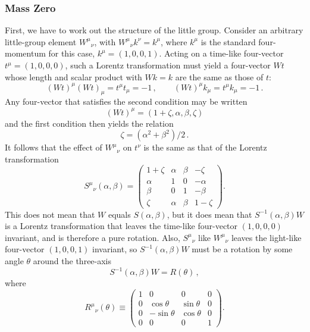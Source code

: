 \subsubsection*{Mass Zero}

First, we have to work out the structure of the little group. Consider an
arbitrary little-group element $W^\mu{}_{\nu}$, with
$W^\mu{}_{\nu}k^\nu=k^\mu$, where $k^\mu$ is the standard four-momentum for
this case, $k^\mu=(1,0,0,1)$. Acting on a time-like four-vector
$t^\mu=(1,0,0,0)$, such a Lorentz transformation must yield a four-vector
$Wt$ whose length and scalar product with $Wk=k$ are the same as those of $t$:
\[
(Wt)^\mu(Wt)_\mu=t^\mu t_\mu=-1\,,
\qquad
(Wt)^\mu k_\mu=t^\mu k_\mu=-1\,.
\]
Any four-vector that satisfies the second condition may be written
\[
(Wt)^\mu=(1+\zeta,\alpha,\beta,\zeta)
\]
and the first condition then yields the relation
\begin{equation}
\zeta=(\alpha^2+\beta^2)/2\,.
\tag{2.5.25}\label{eq:2.5.25}
\end{equation}
It follows that the effect of $W^\mu{}_{\nu}$ on $t^\nu$ is the same as that of
the Lorentz transformation
\begin{equation}
S^\mu{}_{\nu}(\alpha,\beta)=
\begin{pmatrix}
1+\zeta&\alpha&\beta&-\zeta\\
\alpha&1&0&-\alpha\\
\beta&0&1&-\beta\\
\zeta&\alpha&\beta&1-\zeta
\end{pmatrix}.
\tag{2.5.26}\label{eq:2.5.26}
\end{equation}
This does not mean that $W$ equals $S(\alpha,\beta)$, but it does mean that
$S^{-1}(\alpha,\beta)W$ is a Lorentz transformation that leaves the time-like
four-vector $(1,0,0,0)$ invariant, and is therefore a pure rotation. Also,
$S^\mu{}_{\nu}$ like $W^\mu{}_{\nu}$ leaves the light-like four-vector
$(1,0,0,1)$ invariant, so $S^{-1}(\alpha,\beta)W$ must be a rotation by some
angle $\theta$ around the three-axis
\begin{equation}
S^{-1}(\alpha,\beta)W=R(\theta)\,,
\tag{2.5.27}\label{eq:2.5.27}
\end{equation}
where
\[
R^\mu{}_{\nu}(\theta)\equiv
\begin{pmatrix}
1&0&0&0\\
0&\cos\theta&\sin\theta&0\\
0&-\sin\theta&\cos\theta&0\\
0&0&0&1
\end{pmatrix}.
\]
